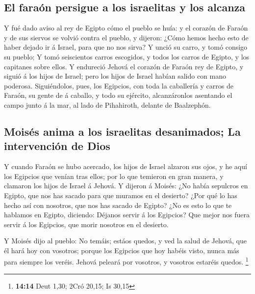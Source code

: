 \hypertarget{el-farauxf3n-persigue-a-los-israelitas-y-los-alcanza}{%
\subsection{El faraón persigue a los israelitas y los
alcanza}\label{el-farauxf3n-persigue-a-los-israelitas-y-los-alcanza}}

 Y fué dado aviso al rey de Egipto cómo el pueblo se huía: y
el corazón de Faraón y de sus siervos se volvió contra el pueblo, y
dijeron: ¿Cómo hemos hecho esto de haber dejado ir á Israel, para que no
nos sirva?  Y unció su carro, y tomó consigo su pueblo;
 Y tomó seiscientos carros escogidos, y todos los carros de
Egipto, y los capitanes sobre ellos.  Y endureció Jehová el
corazón de Faraón rey de Egipto, y siguió á los hijos de Israel; pero
los hijos de Israel habían salido con mano poderosa. 
Siguiéndolos, pues, los Egipcios, con toda la caballería y carros de
Faraón, su gente de á caballo, y todo su ejército, alcanzáronlos
asentando el campo junto á la mar, al lado de Pihahiroth, delante de
Baalzephón.

\hypertarget{moisuxe9s-anima-a-los-israelitas-desanimados-la-intervenciuxf3n-de-dios}{%
\subsection{Moisés anima a los israelitas desanimados; La intervención
de
Dios}\label{moisuxe9s-anima-a-los-israelitas-desanimados-la-intervenciuxf3n-de-dios}}

 Y cuando Faraón se hubo acercado, los hijos de Israel
alzaron sus ojos, y he aquí los Egipcios que venían tras ellos; por lo
que temieron en gran manera, y clamaron los hijos de Israel á Jehová.
 Y dijeron á Moisés: ¿No había sepulcros en Egipto, que nos
has sacado para que muramos en el desierto? ¿Por qué lo has hecho así
con nosotros, que nos has sacado de Egipto?  ¿No es esto lo
que te hablamos en Egipto, diciendo: Déjanos servir á los Egipcios? Que
mejor nos fuera servir á los Egipcios, que morir nosotros en el
desierto.

 Y Moisés dijo al pueblo: No temáis; estáos quedos, y ved
la salud de Jehová, que él hará hoy con vosotros; porque los Egipcios
que hoy habéis visto, nunca más para siempre los veréis. 
Jehová peleará por vosotros, y vosotros estaréis quedos. \footnote{\textbf{14:14}
  Deut 1,30; 2Cró 20,15; Is 30,15}


